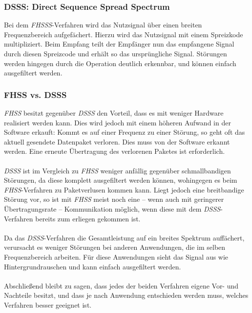         \subsubsection{DSSS: Direct Sequence Spread Spectrum}\label{DSSS}
            Bei dem \textsl{FHSSS}-Verfahren wird das Nutzsignal über einen breiten Frequenzbereich
            aufgefächert. Hierzu wird das Nutzsignal mit einem Spreizkode multipliziert. 
            Beim Empfang teilt der Empfänger nun das empfangene Signal durch diesen Spreizcode
            und erhält so das ursprüngliche Signal. Störungen werden hingegen durch die 
            Operation deutlich erkennbar, und können einfach ausgefiltert werden.
        \subsubsection{FHSS vs. DSSS}\label{FHSSvsDSSS}
            \textsl{FHSS} besitzt gegenüber \textsl{DSSS} den Vorteil, dass es mit weniger Hardware
            realisiert werden kann. 
            Dies wird jedoch mit einem höheren Aufwand in der Software erkauft: Kommt es auf einer
            Frequenz zu einer Störung, so geht oft das aktuell gesendete Datenpaket verloren.
            Dies muss von der Software erkannt werden. Eine erneute Übertragung des verlorenen
            Paketes ist erforderlich.\\
            \\
            \textsl{DSSS} ist im Vergleich zu \textsl{FHSS} weniger anfällig gegenüber
            schmallbandigen Störungen, da diese komplett ausgefiltert werden können, 
            wohingegen es beim \textsl{FHSS}-Verfahren zu Paketverlusen kommen kann.
            Liegt jedoch eine breitbandige Störung vor, so ist mit \textsl{FHSS}
            meist noch eine -- wenn auch mit geringerer Übertragungsrate -- Kommunikation
            möglich, wenn diese mit dem \textsl{DSSS}-Verfahren bereits zum erliegen gekommen ist.\\
            \\
            Da das \textsl{DSSS}-Verfahren die Gesamtleistung auf ein breites Spektrum auffächert,
            verursacht es weniger Störungen bei anderen Anwendungen, die im selben Frequenzbereich
            arbeiten. Für diese Anwendungen sieht das Signal aus wie Hintergrundrauschen und kann
            einfach ausgefiltert werden.\\
            \\
            Abschließend bleibt zu sagen, dass jedes der beiden Verfahren eigene Vor- und Nachteile
            besitzt, und dass je nach Anwendung entschieden werden muss, welches Verfahren
            besser geeignet ist.

